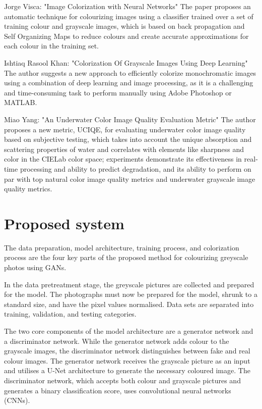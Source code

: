 \documentclass[conference]{IEEEtran}
\begin{document}
Jorge Visca: "Image Colorization with Neural Networks" The paper proposes an automatic technique for colourizing images using a classifier trained over a set of training colour and grayscale images, which is based on back propagation and Self Organizing Maps to reduce colours and create accurate approximations for each colour in the training set.

Ishtiaq Rasool Khan: "Colorization Of Grayscale Images Using Deep Learning" The author suggests a new approach to efficiently colorize monochromatic images using a combination of deep learning and image processing, as it is a challenging and time-consuming task to perform manually using Adobe Photoshop or MATLAB.

Miao Yang: "An Underwater Color Image Quality Evaluation Metric" The author proposes a new metric, UCIQE, for evaluating underwater color image quality based on subjective testing, which takes into account the unique absorption and scattering properties of water and correlates with elements like sharpness and color in the CIELab color space; experiments demonstrate its effectiveness in real-time processing and ability to predict degradation, and its ability to perform on par with top natural color image quality metrics and underwater grayscale image quality metrics.

\section{Proposed system}\label{Proposed system}
The data preparation, model architecture, training process, and colorization process are the four key parts of the proposed method for colourizing greyscale photos using GANs.

In the data pretreatment stage, the greyscale pictures are collected and prepared for the model. The photographs must now be prepared for the model, shrunk to a standard size, and have the pixel values normalised. Data sets are separated into training, validation, and testing categories.

The two core components of the model architecture are a generator network and a discriminator network. While the generator network adds colour to the grayscale images, the discriminator network distinguishes between fake and real colour images. The generator network receives the grayscale picture as an input and utilises a U-Net architecture to generate the necessary coloured image. The discriminator network, which accepts both colour and grayscale pictures and generates a binary classification score, uses convolutional neural networks (CNNs).
\end{document}
